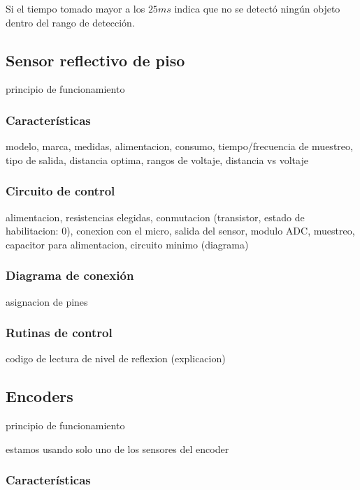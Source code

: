 Si el tiempo tomado mayor a los $25ms$ indica que no se detect\'o ning\'un objeto dentro del rango de detecci\'on.

\subsection{Sensor reflectivo de piso}
\label{h_sensado_piso}

principio de funcionamiento

\subsubsection{Caracter\'isticas}
\label{h_sensado_piso_caracteristicas}

modelo, marca, medidas, alimentacion, consumo, tiempo/frecuencia de muestreo, tipo de salida, distancia optima, rangos de voltaje, distancia vs voltaje

\subsubsection{Circuito de control}
\label{h_sensado_piso_circuito}

alimentacion, resistencias elegidas, conmutacion (transistor, estado de habilitacion: 0), conexion con el micro, salida del sensor, modulo ADC, muestreo, capacitor para alimentacion, circuito minimo (diagrama)

\subsubsection{Diagrama de conexi\'on}
\label{h_sensado_piso_diagrama}

asignacion de pines

\subsubsection{Rutinas de control}
\label{h_sensado_piso_rutinas}

codigo de lectura de nivel de reflexion (explicacion)

\subsection{Encoders}
\label{h_sensado_encoder}

principio de funcionamiento

estamos usando solo uno de los sensores del encoder

\subsubsection{Caracter\'isticas}
\label{h_sensado_encoder_caracteristicas}

